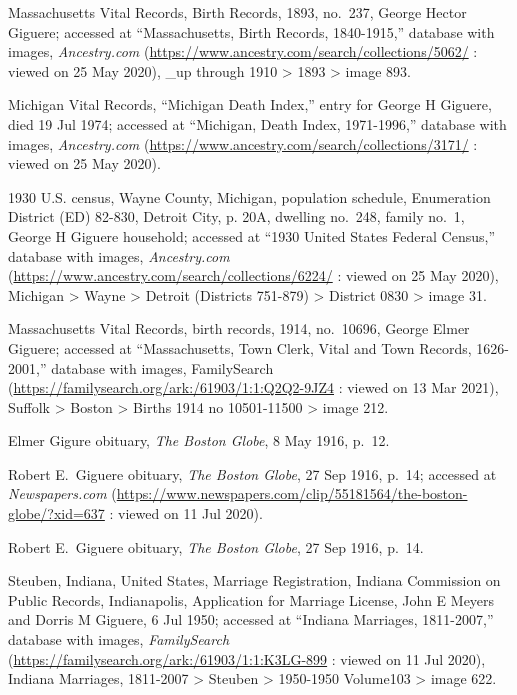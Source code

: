\begin{thebibliography}{999}
Massachusetts Vital Records, Birth Records, 1893, no.\  237, George Hector Giguere; accessed at ``Massachusetts, Birth Records, 1840-1915,'' database with images, \textit{Ancestry.com} (\url{https://www.ancestry.com/search/collections/5062/} : viewed on 25 May 2020), \_up through 1910 > 1893 > image 893.

Michigan Vital Records, ``Michigan Death Index,'' entry for George H Giguere, died 19 Jul 1974; accessed at ``Michigan, Death Index, 1971-1996,'' database with images, \textit{Ancestry.com} (\url{https://www.ancestry.com/search/collections/3171/} : viewed on 25 May 2020).

1930 U.S. census, Wayne County, Michigan, population schedule, Enumeration District (ED) 82-830, Detroit City, p. 20A, dwelling no.\ 248, family no.\ 1, George H Giguere household; accessed at ``1930 United States Federal Census,'' database with images, \textit{Ancestry.com} (\url{https://www.ancestry.com/search/collections/6224/} : viewed on 25 May 2020), Michigan > Wayne > Detroit (Districts 751-879) > District 0830 > image 31.

Massachusetts Vital Records, birth records, 1914, no.\ 10696, George Elmer Giguere; accessed at ``Massachusetts, Town Clerk, Vital and Town Records, 1626-2001,'' database with images, FamilySearch (\url{https://familysearch.org/ark:/61903/1:1:Q2Q2-9JZ4} : viewed on 13 Mar 2021), Suffolk > Boston > Births 1914 no 10501-11500 > image 212.

Elmer Gigure obituary, \textit{The Boston Globe}, 8 May 1916, p.\ 12.
	
Robert E.\ Giguere obituary, \textit{The Boston Globe}, 27 Sep 1916, p.\ 14; accessed at \textit{Newspapers.com} (\url{https://www.newspapers.com/clip/55181564/the-boston-globe/?xid=637} : viewed on 11 Jul 2020).

Robert E.\ Giguere obituary, \textit{The Boston Globe}, 27 Sep 1916, p.\ 14.

Steuben, Indiana, United States, Marriage Registration, Indiana Commission on Public Records, Indianapolis, Application for Marriage License, John E Meyers and Dorris M Giguere, 6 Jul 1950; accessed at ``Indiana Marriages, 1811-2007,'' database with images, \textit{FamilySearch} (\url{https://familysearch.org/ark:/61903/1:1:K3LG-899} : viewed on 11 Jul 2020), Indiana Marriages, 1811-2007 > Steuben > 1950-1950 Volume103 > image 622.


\end{thebibliography}
